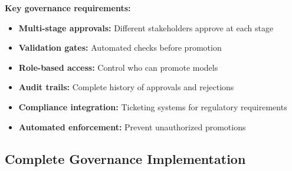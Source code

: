 \textbf{Key governance requirements:}
\begin{itemize}
    \item \textbf{Multi-stage approvals:} Different stakeholders approve at each stage
    \item \textbf{Validation gates:} Automated checks before promotion
    \item \textbf{Role-based access:} Control who can promote models
    \item \textbf{Audit trails:} Complete history of approvals and rejections
    \item \textbf{Compliance integration:} Ticketing systems for regulatory requirements
    \item \textbf{Automated enforcement:} Prevent unauthorized promotions
\end{itemize}

\subsection{Complete Governance Implementation}

